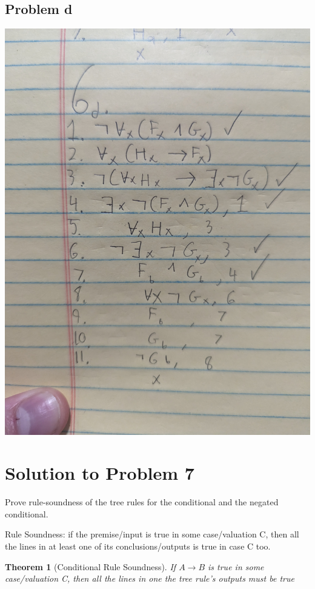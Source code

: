 \documentclass[12pt]{article}
\newtheorem{theorem}{Theorem}
\begin{document}
\subsection*{Problem d}
\includegraphics[width=\textwidth]{6d}

\section*{Solution to Problem 7}

Prove rule-soundness of the tree rules for the conditional and the negated conditional.

Rule Soundness: if the premise/input is true in some case/valuation C, then all the lines in at least one of its conclusions/outputs is true in case C too.

\begin{theorem}[Conditional Rule Soundness]
    If $A \rightarrow B$ is true in some case/valuation C, then all the lines in one the tree rule's outputs must be true
\end{theorem}
\end{document}
